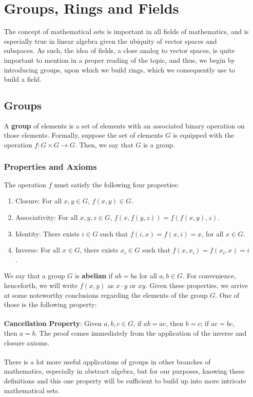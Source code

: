 \documentclass[11pt]{report}
\begin{document}
\chapter{Groups, Rings and Fields}
The concept of mathematical sets is important in all fields of mathematics, and is especially true in linear algebra given the ubiquity of vector spaces and subspaces. As such, the idea of fields, a close analog to vector spaces, is quite important to mention in a proper reading of the topic, and thus, we begin by introducing groups, upon which we build rings, which we consequently use to build a field.
\section{Groups}
A \textbf{group} of elements is a set of elements with an associated binary operation on those elements. Formally, suppose the set of elements $G$ is equipped with the operation $f: G \times G \rightarrow G$. Then, we say that $G$ is a group.
\subsection{Properties and Axioms}
The operation $f$ must satisfy the following four properties:
\begin{enumerate}
\item Closure: For all $x,y \in G$, $f(x,y) \in G$.
\item Associativity: For all $x,y,z \in G$, $f(x,f(y,z)) = f(f(x,y),z)$.
\item Identity: There exists $i \in G$ such that $f(i,x) = f(x,i) = x$, for all $x \in G$.
\item Inverse: For all $x \in G$, there exists $x_i \in G$ such that $f(x, x_i) = f(x_i, x) = i$. 
\end{enumerate}
We say that a group $G$ is \textbf{abelian} if $ab = ba$ for all $a,b \in G$. For convenience, henceforth, we will write $f(x,y)$ as $x \cdot y$ or $xy$. Given these properties, we arrive at some noteworthy conclusions regarding the elements of the group $G$. One of those is the following property:
\\ \\
\textbf{Cancellation Property}: Given $a,b,c \in G$, if $ab = ac$, then $b = c$; if $ac = bc$, then $a = b$. The proof comes immediately from the application of the inverse and closure axioms.
\\ \\
There is a lot more useful applications of groups in other branches of mathematics, especially in abstract algebra, but for our purposes, knowing these definitions and this one property will be sufficient to build up into more intricate mathematical sets.
\end{document}

